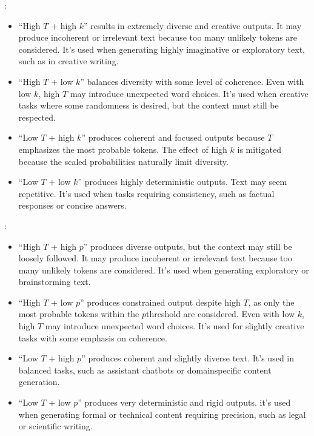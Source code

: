 \documentclass[letterpaper,11pt,english]{sphinxmanual}
\begin{document}
\sphinxAtStartPar
{}:
\begin{itemize}
\item {} 
\sphinxAtStartPar
“High \(T\) + high \(k\)” results in extremely diverse and
creative outputs. It may produce incoherent or irrelevant text because
too many unlikely tokens are considered. It’s used when generating
highly imaginative or exploratory text, such as in creative writing.

\item {} 
\sphinxAtStartPar
“High \(T\) + low \(k\)” balances diversity with some level of
coherence. Even with low \(k\), high \(T\) may introduce
unexpected word choices. It’s used when creative tasks where some
randomness is desired, but the context must still be respected.

\item {} 
\sphinxAtStartPar
“Low \(T\) + high \(k\)” produces coherent and focused outputs
because \(T\) emphasizes the most probable tokens. The effect of
high \(k\) is mitigated because the scaled probabilities naturally
limit diversity.

\item {} 
\sphinxAtStartPar
“Low \(T\) + low \(k\)” produces highly deterministic outputs.
Text may seem repetitive. It’s used when tasks requiring consistency,
such as factual responses or concise answers.

\end{itemize}

\sphinxAtStartPar
{}:
\begin{itemize}
\item {} 
\sphinxAtStartPar
“High \(T\) + high \(p\)” produces diverse outputs, but the
context may still be loosely followed. It may produce incoherent or
irrelevant text because too many unlikely tokens are considered. It’s
used when generating exploratory or brainstorming text.

\item {} 
\sphinxAtStartPar
“High \(T\) + low \(p\)” produces constrained output despite
high \(T\), as only the most probable tokens within the
\(p\)\sphinxhyphen{}threshold are considered. Even with low \(k\), high
\(T\) may introduce unexpected word choices. It’s used for
slightly creative tasks with some emphasis on coherence.

\item {} 
\sphinxAtStartPar
“Low \(T\) + high \(p\)” produces coherent and slightly
diverse text. It’s used in balanced tasks, such as assistant chatbots
or domain\sphinxhyphen{}specific content generation.

\item {} 
\sphinxAtStartPar
“Low \(T\) + low \(p\)” produces very deterministic and rigid
outputs. it’s used when generating formal or technical content
requiring precision, such as legal or scientific writing.

\end{itemize}
\end{document}
